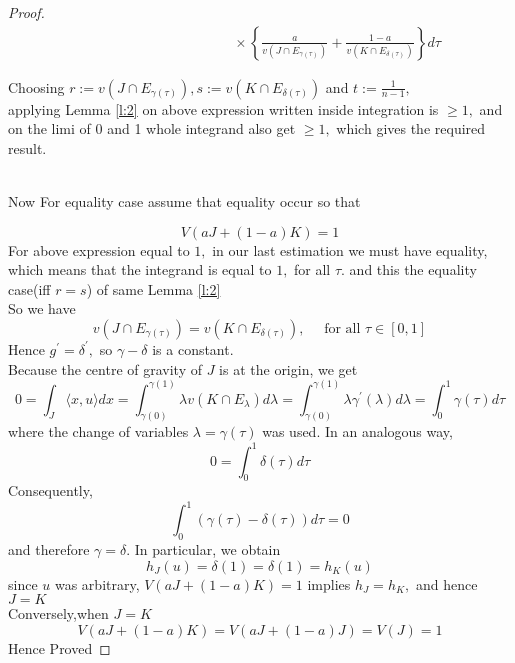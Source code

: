\documentclass[oneside]{book}
\begin{document}
\begin{proof}
\[\begin{array}{l}
\quad \quad \quad \quad \quad \quad \quad \quad \quad \quad \quad \times \left\{ \frac{a}{v\left(J \cap E_{\gamma(\tau)}\right)}+\frac{1-a}{v\left(K \cap E_{\delta(\tau)}\right)}\right\} d \tau
\end{array}
\]














Choosing $r:=v\left(J \cap E_{\gamma(\tau)}\right), s:=v\left(K \cap E_{\delta(\tau)}\right)$ and $t:=\frac{1}{n-1},$
\\

applying  Lemma \ref{l:2} on above expression written inside integration is $\geq 1,$ and on the limi of 0 and 1 whole integrand also get  $\geq 1,$ which gives the required result.

\\
 Now For equality case assume that equality occur so that

\[
V(a J+(1-a) K) = 1 
\]
 For above expression equal to $1,$ in our last estimation we must have equality, which means that the integrand  is equal to $1,$ for all $\tau .
 $ and this the equality case(iff $r = s$) of same Lemma \ref{l:2}
 \\
 So we have 
\[
v\left(J \cap                E_{\gamma(\tau)}\right)=v\left(K \cap E_{\delta(\tau)}\right), \quad \text { for all } \tau \in[0,1]
\]
Hence $g^{\prime}= \delta^{\prime},$ so $\gamma- \delta$ is a constant.\\

Because the centre of gravity of $J$ is at the origin, we get 
\\
\[
0=\int_{J}\langle x, u\rangle d x=\int_{\gamma(0)}^{\gamma(1)} \lambda v\left(K \cap E_{\lambda}\right) d \lambda=\int_{\gamma(0)}^{\gamma(1)} \lambda \gamma^{\prime}(\lambda) d \lambda=\int_{0}^{1} \gamma(\tau) d \tau
\]
where the change of variables $\lambda=\gamma(\tau)$ was used. In an analogous way,
\[
0=\int_{0}^{1} \delta(\tau) d \tau
\]
Consequently,
\[
\int_{0}^{1}(\gamma(\tau)-\delta(\tau)) d \tau=0
\]
and therefore $\gamma=\delta .$ In particular, we obtain
\[
h_{J}(u)=\delta(1)=\delta(1)=h_{K}(u)
\]
since $u$ was arbitrary, $V(a J+(1-a) K)=1$ implies $h_{J}=h_{K},$ and hence $J=K$ \\
Conversely,when $J=K$ 
$$V(a J+(1-a) K)=V(a J+(1-a) J) =  V(J) = 1 $$
Hence Proved
 \end{proof}
 \hfill \break
 
\end{document}
